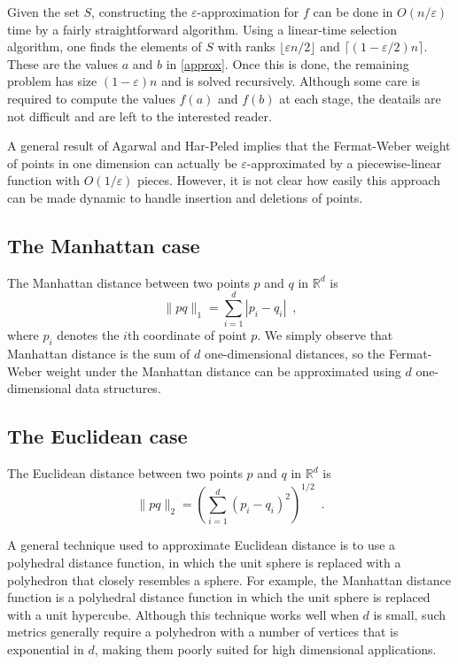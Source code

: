 \documentclass[charterfonts,lotsofwhite]{patmorin}
\newcommand{\eps}{\varepsilon}
\newcommand{\Real}{\mathbb{R}}
\begin{document}
Given the set $S$, constructing the $\eps$-approximation for $f$
can be done in $O(n/\eps)$ time by a fairly straightforward
algorithm.  Using a linear-time selection algorithm, one finds the
elements of $S$ with ranks $\lfloor\eps n/2\rfloor$ and
$\lceil(1-\eps/2) n\rceil$.  These are the values $a$ and $b$ in
\eqref{approx}.  Once this is done, the remaining problem has size
$(1-\eps) n$ and is solved recursively.  Although some care is
required to compute the values $f(a)$ and $f(b)$ at each stage, the
deatails are not difficult and are left to the interested reader.

\begin{rem} 
A general result of Agarwal and Har-Peled \cite{ah01} implies that the
Fermat-Weber weight of points in one dimension can actually be
$\eps$-approximated by a piecewise-linear function with $O(1/\eps)$
pieces.  However, it is not clear how easily this approach can be made
dynamic to handle insertion and deletions of points.
\end{rem}

\subsection{The Manhattan case}

The Manhattan distance between two points $p$ and $q$ in $\Real^d$ is
\[
\|pq\|_1 = \sum_{i=1}^d |p_i-q_i| \enspace ,
\]
where $p_i$ denotes the $i$th coordinate of point $p$.  We simply
observe that Manhattan distance is the sum of $d$ one-dimensional
distances, so the Fermat-Weber weight under the Manhattan distance can
be approximated using $d$ one-dimensional data structures.

\subsection{The Euclidean case}

The Euclidean distance between two points $p$ and $q$ in $\Real^d$ is
\[
\|pq\|_2 = \left(\sum_{i=1}^d (p_i-q_i)^2\right)^{1/2} \enspace .
\]

A general technique used to approximate Euclidean distance is to use a
polyhedral distance function, in which the unit sphere is replaced
with a polyhedron that closely resembles a sphere.  For example, the
Manhattan distance function is a polyhedral distance function in which
the unit sphere is replaced with a unit hypercube.  Although this
technique works well when $d$ is small, such metrics generally require
a polyhedron with a number of vertices that is exponential in $d$,
making them poorly suited for high dimensional applications.
\end{document}

